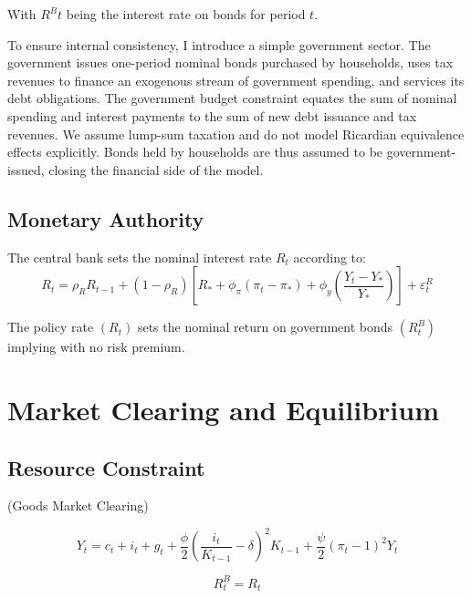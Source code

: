 \documentclass[11pt,preprint]{elsarticle}
\numberwithin{equation}{section}
\numberwithin{figure}{section}
\numberwithin{table}{section}
\begin{document}
With \(R^Bt\) being the interest rate on bonds for period \(t\).

To ensure internal consistency, I introduce a simple government sector.
The government issues one-period nominal bonds purchased by households,
uses tax revenues to finance an exogenous stream of government spending,
and services its debt obligations. The government budget constraint
equates the sum of nominal spending and interest payments to the sum of
new debt issuance and tax revenues. We assume lump-sum taxation and do
not model Ricardian equivalence effects explicitly. Bonds held by
households are thus assumed to be government-issued, closing the
financial side of the model.

\subsection{Monetary Authority}\label{monetary-authority}

The central bank sets the nominal interest rate \(R_t\) according to:\\
\begin{equation}
R_t = \rho_R R_{t-1} + (1 - \rho_R) \left[ R_* + \phi_\pi (\pi_t - \pi_*) + \phi_y \left( \frac{Y_t - Y_*}{Y_*} \right) \right] + \varepsilon_t^R
\label{taylor_rule}
\end{equation}

The policy rate \((R_t)\) sets the nominal return on government bonds
\((R_t^B)\) implying with no risk premium.

\section{Market Clearing and
Equilibrium}\label{market-clearing-and-equilibrium}

\subsection{Resource Constraint}\label{resource-constraint}

(Goods Market Clearing)

\begin{equation}
   Y_t = c_t + i_t + g_t + \frac{\phi}{2} \left( \frac{i_t}{K_{t-1}} - \delta \right)^2 K_{t-1} + \frac{\psi}{2} (\pi_t - 1)^2 Y_t
   \label{clearing_resource_constraint}
\end{equation}

\begin{equation}
R_t^B = R_t 
\label{interest_parity}
\end{equation}
\end{document}
